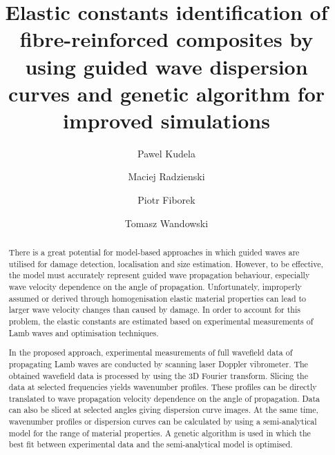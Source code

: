 \documentclass[preprint,12pt]{elsarticle}
\begin{document}
	\begin{frontmatter}

		\title{Elastic constants identification of fibre-reinforced composites by using guided wave dispersion curves and genetic algorithm for improved simulations}

		\address[IFFM]{Institute of Fluid Flow Machinery, Polish Academy of Sciences, Poland}

		\author{Pawel Kudela}
		\author{Maciej Radzienski}
		\author{Piotr Fiborek }
		\author{Tomasz Wandowski }	


\begin{abstract}
There is a great potential for model-based approaches in which guided waves are utilised for damage detection, localisation and size estimation. 
However, to be effective, the model must accurately represent guided wave propagation behaviour, especially wave velocity dependence on the angle of propagation. 
Unfortunately, improperly assumed or derived through homogenisation elastic material properties can lead to larger wave velocity changes than caused by damage. 
In order to account for this problem, the elastic constants are estimated based on experimental measurements of Lamb waves and optimisation techniques. 

In the proposed approach, experimental measurements of full wavefield data of propagating Lamb
waves are conducted by scanning laser Doppler vibrometer. 
The obtained wavefield data is processed by using the 3D Fourier transform. 
Slicing the data at selected frequencies yields wavenumber profiles. 
These profiles can be directly translated to wave propagation velocity dependence on the angle of propagation. 
Data can also be sliced at selected angles giving dispersion curve images. 
At the same time, wavenumber profiles or dispersion curves can be calculated by using a semi-analytical model for the range of material properties. 
A genetic algorithm is used in which the best fit between experimental data and the semi-analytical model is optimised.


\end{abstract}
\end{frontmatter}
\end{document}
